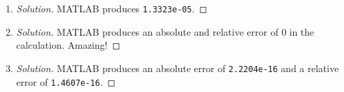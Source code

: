 \documentclass{article}
\begin{document}
\begin{enumerate}
\begin{proof}[Solution]
		so much larger than the others.
	\end{proof}	
	\item \begin{proof}[Solution]\let\qed\relax
		MATLAB produces \verb|1.3323e-05|.
	\end{proof}
	\item \begin{proof}[Solution]\let\qed\relax
		MATLAB produces an absolute and relative error of $0$ in the calculation.
		Amazing!
	\end{proof}
	\item \begin{proof}[Solution]\let\qed\relax
		MATLAB produces an absolute error of \verb|2.2204e-16|
		and a relative error of \verb|1.4607e-16|.
	\end{proof}
\end{enumerate}
\end{document}
